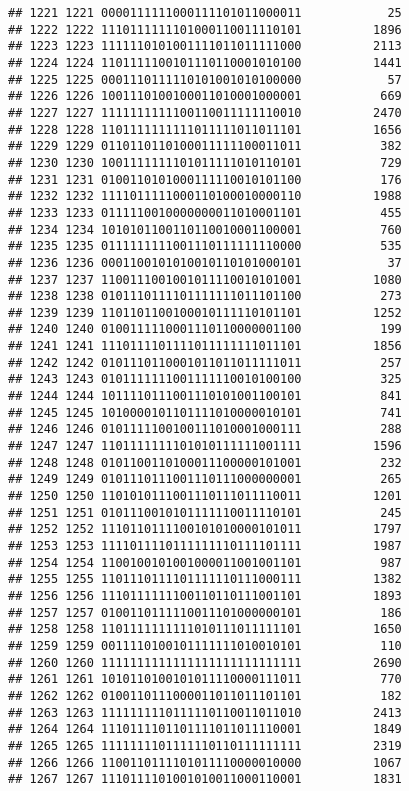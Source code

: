 \documentclass[]{article}
\begin{document}
\begin{verbatim}
## 1221 1221 0000111111000111101011000011            25
## 1222 1222 1110111111101000110011110101          1896
## 1223 1223 1111110101001111011011111000          2113
## 1224 1224 1101111100101110110001010100          1441
## 1225 1225 0001110111110101001010100000            57
## 1226 1226 1001110100100011010001000001           669
## 1227 1227 1111111111100110011111110010          2470
## 1228 1228 1101111111111011111011011101          1656
## 1229 1229 0110110110100011111100011011           382
## 1230 1230 1001111111101011111010110101           729
## 1231 1231 0100110101000111110010101100           176
## 1232 1232 1111011111000110100010000110          1988
## 1233 1233 0111110010000000011010001101           455
## 1234 1234 1010101100110110010001100001           760
## 1235 1235 0111111111001110111111110000           535
## 1236 1236 0001100101010010110101000101            37
## 1237 1237 1100111001001011110010101001          1080
## 1238 1238 0101110111101111111011101100           273
## 1239 1239 1101101100100010111110101101          1252
## 1240 1240 0100111110001110110000001100           199
## 1241 1241 1110111101111011111111011101          1856
## 1242 1242 0101110110001011011011111011           257
## 1243 1243 0101111111001111110010100100           325
## 1244 1244 1011110111001110101001100101           841
## 1245 1245 1010000101101111010000010101           741
## 1246 1246 0101111100100111010001000111           288
## 1247 1247 1101111111101010111111001111          1596
## 1248 1248 0101100110100011100000101001           232
## 1249 1249 0101110111001110111000000001           265
## 1250 1250 1101010111001110111011110011          1201
## 1251 1251 0101110010101111110011110101           245
## 1252 1252 1110110111100101010000101011          1797
## 1253 1253 1111011110111111110111101111          1987
## 1254 1254 1100100101001000011001001101           987
## 1255 1255 1101110111101111110111000111          1382
## 1256 1256 1110111111100110110111001101          1893
## 1257 1257 0100110111110011101000000101           186
## 1258 1258 1101111111111010111011111101          1650
## 1259 1259 0011110100101111111010010101           110
## 1260 1260 1111111111111111111111111111          2690
## 1261 1261 1010110100101011110000111011           770
## 1262 1262 0100110111000011011011101101           182
## 1263 1263 1111111110111110110011011010          2413
## 1264 1264 1110111101101111011011110001          1849
## 1265 1265 1111111101111110110111111111          2319
## 1266 1266 1100110111101011110000010000          1067
## 1267 1267 1110111101001010011000110001          1831

\end{verbatim}
\end{document}

